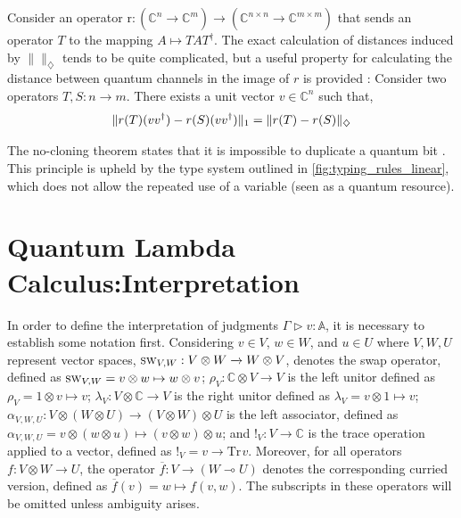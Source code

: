 Consider an operator  $ \text{r} : (\mathbb{C}^{n} \xrightarrow[]{} \mathbb{C}^{m}) \xrightarrow[]{} (\mathbb{C}^{n\times n}\xrightarrow[]{} \mathbb{C}^{m\times m})$ that sends an operator $T$ to the mapping $A \mapsto TAT^{\dag}$. The exact calculation of distances induced by $\lVert \rVert_{\diamondsuit}$ tends to be quite complicated, but a useful property for calculating the distance between quantum channels in the image of $r$ is provided \cite{watrous2018theory}:
Consider two operators $T, S : n \xrightarrow{} m$. There exists a unit vector $v \in \mathbb{C}^{n}$ such that, 
\begin{equation} \label{eq:norm_iso_r}
\begin{centering}
\lVert r(T) (vv^{\dag})-r(S) (vv^{\dag}) \rVert_{1} = \lVert r(T)-r(S) \rVert_{\diamondsuit}
 \end{centering}
\end{equation}




The no-cloning theorem states that it is impossible to duplicate a quantum bit \cite{wootters1982single}. This principle is upheld by the type system outlined in \autoref{fig:typing_rules_linear}, which does not allow the repeated use of a variable (seen as a quantum resource).



\section{Quantum Lambda Calculus:Interpretation} \label{sec:Quantum Lambda Calculus:Interpretation}

In order to define the interpretation of judgments $\Gamma \triangleright v: \mathbb{A}$, it is necessary to establish some notation first. Considering $v \in V$, $w \in W$, and $u \in U$  where $V, W, U$ represent vector spaces,  $\textsc{sw}_{V,W} : V\otimes W \xrightarrow{} W \otimes V$, denotes the swap operator, defined as $\textsc{sw}_{V,W}= v\otimes w \mapsto w \otimes v$;    $\rho_{V} : \mathbb{C} \otimes V \xrightarrow{} V $ is the left unitor defined as $\rho_{V}= 1 \otimes v \mapsto v $; $\lambda_{V} : V  \otimes \mathbb{C} \xrightarrow{} V $ is the right unitor defined as $\lambda_{V}= v \otimes 1 \mapsto v$; $\alpha_{V,W,U} : V  \otimes (W \otimes U) \xrightarrow{} (V  \otimes W) \otimes U$ is the left associator, defined as $\alpha_{V,W,U}= v \otimes (w \otimes u) \mapsto (v \otimes w) \otimes u $; and $!_{V}: V \xrightarrow{} \mathbb{C}$ is the trace operation applied to a vector, defined as  $!_{V}= v \xrightarrow{} \text{Tr} \hspace{1pt}v$. Moreover, for all operators $f: V \otimes W \xrightarrow{} U$, the operator $\overline{f} : V \xrightarrow{} (W \multimap U)$ denotes the corresponding curried version, defined as $\overline{f}(v) = w \mapsto  f(v,w)$. The subscripts in these operators will be omitted unless ambiguity arises.

